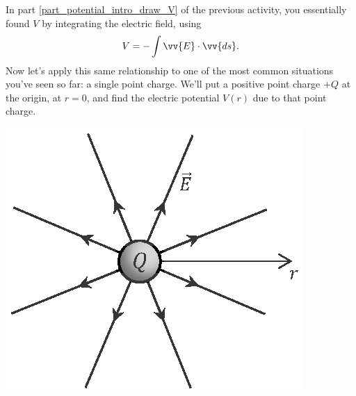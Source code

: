 In part \ref{part_potential_intro_draw_V} of the previous activity, you essentially found $V$ by integrating the electric field, using
$$V=-\int{\vv{E} \cdot \vv{ds}}.$$
Now let's apply this same relationship to one of the most common situations you've seen so far: a single point charge.  We'll put a positive point charge $+Q$ at the origin, at $r=0$, and find the electric potential $V(r)$ due to that point charge.
\begin{center}
\vspace{-0.1 in}
\includegraphics{potential_intro/activity_6_figs/point_charge_E_field_axis.eps}
\end{center}

